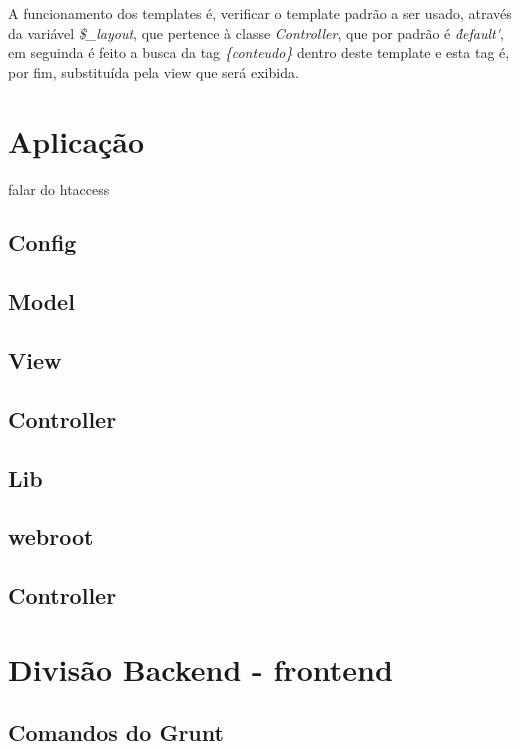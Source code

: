             A funcionamento dos templates é, verificar o template padrão a ser usado, através da variável \emph{\$\_layout}, que pertence à classe \emph{Controller}, que por padrão é \emph{\'default\'}, em seguinda é feito a busca da tag \emph{\{conteudo\}} dentro deste template e esta tag é, por fim, substituída pela view que será exibida.


    \section{Aplicação\label{sec:app}}

        falar do htaccess

        \subsection{Config\label{sec:app-config}}

        \subsection{Model\label{sec:app-model}}

        \subsection{View\label{sec:app-view}}

        \subsection{Controller\label{sec:app-controller}}

        \subsection{Lib\label{sec:app-lib}}

        \subsection{webroot\label{sec:app-lib}}


        \subsection{Controller\label{sec:app-controller}}


    \section{Divisão Backend - frontend\label{sec:back-front}}


        \subsection{Comandos do Grunt\label{sub:comandos-grunt}}
